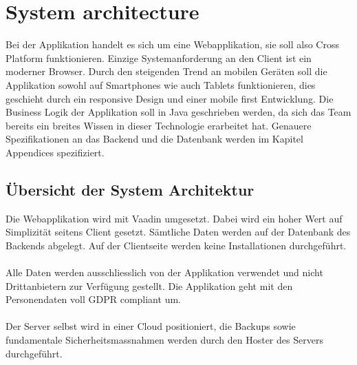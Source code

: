 \chapter{System architecture}
Bei der Applikation handelt es sich um eine Webapplikation, sie soll also \gls{Cross Platform} funktionieren. Einzige Systemanforderung an den Client ist ein moderner Browser. Durch den steigenden Trend an mobilen Geräten soll die Applikation sowohl auf Smartphones wie auch Tablets funktionieren, dies geschieht durch ein \gls{responsive Design} und einer \gls{mobile first} Entwicklung. Die Business Logik der Applikation soll in Java geschrieben werden, da sich das Team bereits ein breites Wissen in dieser Technologie erarbeitet hat. Genauere Spezifikationen an das Backend und die Datenbank werden im Kapitel Appendices spezifiziert.

\section{Übersicht der System Architektur}

Die Webapplikation wird mit \gls{Vaadin} umgesetzt. Dabei wird ein hoher Wert auf Simplizität seitens Client gesetzt. Sämtliche Daten werden auf der Datenbank des Backends abgelegt. Auf der Clientseite werden keine Installationen durchgeführt. \\ \\
Alle Daten werden ausschliesslich von der Applikation verwendet und nicht Drittanbietern zur Verfügung gestellt. Die Applikation geht mit den Personendaten voll \gls{GDPR compliant} um. \\ \\
Der Server selbst wird in einer Cloud positioniert, die Backups sowie fundamentale Sicherheitsmassnahmen werden durch den Hoster des Servers durchgeführt.
